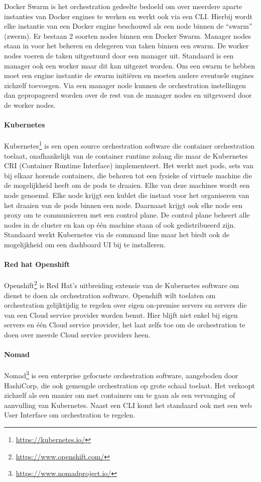 Docker Swarm is het orchestration gedeelte bedoeld om over meerdere aparte instanties van Docker engines te werken en werkt ook via een CLI. Hierbij wordt elke instantie van een Docker engine beschouwd als een node binnen de “swarm” (zwerm). Er bestaan 2 soorten nodes binnen een Docker Swarm. Manager nodes staan in voor het beheren en delegeren van taken binnen een swarm. De worker nodes voeren de taken uitgestuurd door een manager uit. Standaard is een manager ook een worker maar dit kan uitgezet worden. Om een swarm te hebben moet een engine instantie de swarm initiëren en moeten andere eventuele engines zichzelf toevoegen. Via een manager node kunnen de orchestration instellingen dan gepropageerd worden over de rest van de manager nodes en uitgevoerd door de worker nodes.
\paragraph{Kubernetes}
Kubernetes\footnote{\url{https://kubernetes.io/}} is een open source orchestration software die container orchestration toelaat, onafhankelijk van de container runtime zolang die maar de Kubernetes CRI (Container Runtime Interface) implementeert. Het werkt met pods, sets van bij elkaar horende containers, die behoren tot een fysieke of virtuele machine die de mogelijkheid heeft om de pods te draaien. Elke van deze machines wordt een node genoemd. Elke node krijgt een kublet die instaat voor het organiseren van het draaien van de pods binnen een node. Daarnaast krijgt ook elke node een proxy om te communiceren met een control plane. De control plane beheert alle nodes in de cluster en kan op één machine staan of ook gedistribueerd zijn. Standaard werkt Kubernetes via de command line maar het biedt ook de mogelijkheid om een dashboard UI bij te installeren.
\paragraph{Red hat Openshift}
Openshift\footnote{\url{https://www.openshift.com/}} is Red Hat’s uitbreiding extensie van de Kubernetes software om dienst te doen als orchestration software. Openshift wilt toelaten om orchestration gelijktijdig te regelen over eigen on-premise servers en servers die van een Cloud service provider worden benut. Hier blijft niet enkel bij eigen servers en één Cloud service provider, het laat zelfs toe om de orchestration te doen over meerde Cloud service providers heen.
\paragraph{Nomad}
Nomad\footnote{\url{https://www.nomadproject.io/}} is een enterprise gefocuste orchestration software, aangeboden door HashiCorp, die ook gemengde orchestration op grote schaal toelaat. Het verkoopt zichzelf als een manier om met containers om te gaan als een vervanging of aanvulling van Kubernetes. Naast een CLI komt het standaard ook met een web User Interface om orchestration te regelen.
